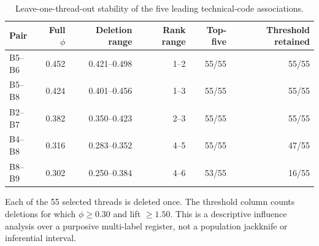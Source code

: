 \begin{table}[tp]
\centering
\caption{Leave-one-thread-out stability of the five leading technical-code associations.}
\label{tab:s-association-loto}
\begin{threeparttable}
\begin{tabular}{@{}lrrrrr@{}}
\toprule
Pair & Full $\phi$ & Deletion range & Rank range & Top-five & Threshold retained \\
\midrule
B5--B6 & 0.452 & 0.421--0.498 & 1--2 & 55/55 & 55/55 \\
B5--B8 & 0.424 & 0.401--0.456 & 1--3 & 55/55 & 55/55 \\
B2--B7 & 0.382 & 0.350--0.423 & 2--3 & 55/55 & 55/55 \\
B4--B8 & 0.316 & 0.283--0.352 & 4--5 & 55/55 & 47/55 \\
B8--B9 & 0.302 & 0.250--0.384 & 4--6 & 53/55 & 16/55 \\
\bottomrule
\end{tabular}
\begin{tablenotes}[flushleft]\footnotesize
\item Each of the 55 selected threads is deleted once. The threshold column counts deletions for which $\phi\geq0.30$ and lift $\geq1.50$. This is a descriptive influence analysis over a purposive multi-label register, not a population jackknife or inferential interval.
\end{tablenotes}
\end{threeparttable}
\end{table}
